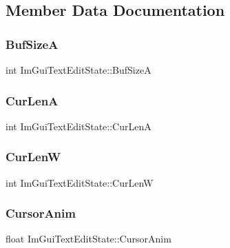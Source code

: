 \subsection{Member Data Documentation}
\hypertarget{struct_im_gui_text_edit_state_a73190bd16bf8bb58c827e66b9e28e071}{}\label{struct_im_gui_text_edit_state_a73190bd16bf8bb58c827e66b9e28e071} 
\subsubsection{\texorpdfstring{Buf\+SizeA}{BufSizeA}}
{\footnotesize\ttfamily int Im\+Gui\+Text\+Edit\+State\+::\+Buf\+SizeA}

\hypertarget{struct_im_gui_text_edit_state_a007dc39101b6b1cfa78dcbad828b8659}{}\label{struct_im_gui_text_edit_state_a007dc39101b6b1cfa78dcbad828b8659} 
\subsubsection{\texorpdfstring{Cur\+LenA}{CurLenA}}
{\footnotesize\ttfamily int Im\+Gui\+Text\+Edit\+State\+::\+Cur\+LenA}

\hypertarget{struct_im_gui_text_edit_state_aee70a14eaf9dfb09bee698aef2de40b2}{}\label{struct_im_gui_text_edit_state_aee70a14eaf9dfb09bee698aef2de40b2} 
\subsubsection{\texorpdfstring{Cur\+LenW}{CurLenW}}
{\footnotesize\ttfamily int Im\+Gui\+Text\+Edit\+State\+::\+Cur\+LenW}

\hypertarget{struct_im_gui_text_edit_state_a743c35c5d6559183f41e09e32ae967f4}{}\label{struct_im_gui_text_edit_state_a743c35c5d6559183f41e09e32ae967f4} 
\subsubsection{\texorpdfstring{Cursor\+Anim}{CursorAnim}}
{\footnotesize\ttfamily float Im\+Gui\+Text\+Edit\+State\+::\+Cursor\+Anim}

